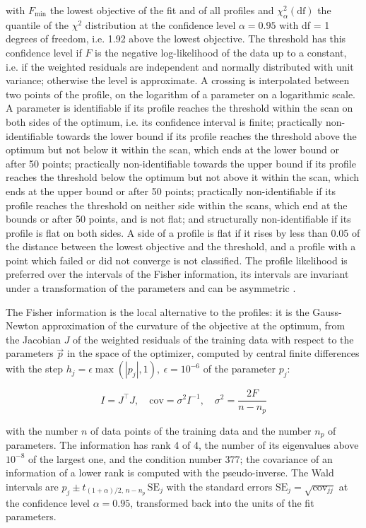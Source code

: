 \documentclass{article}
\begin{document}
with $F_{\min}$ the lowest objective of the fit and of all profiles and $\chi^2_{\alpha}(\mathrm{df})$ the quantile of the $\chi^2$ distribution at the confidence level $\alpha = 0.95$ with df = 1 degrees of freedom, i.e. 1.92 above the lowest objective. The threshold has this confidence level if $F$ is the negative log-likelihood of the data up to a constant, i.e. if the weighted residuals are independent and normally distributed with unit variance; otherwise the level is approximate. A crossing is interpolated between two points of the profile, on the logarithm of a parameter on a logarithmic scale. A parameter is identifiable if its profile reaches the threshold within the scan on both sides of the optimum, i.e. its confidence interval is finite; practically non-identifiable towards the lower bound if its profile reaches the threshold above the optimum but not below it within the scan, which ends at the lower bound or after 50 points; practically non-identifiable towards the upper bound if its profile reaches the threshold below the optimum but not above it within the scan, which ends at the upper bound or after 50 points; practically non-identifiable if its profile reaches the threshold on neither side within the scans, which end at the bounds or after 50 points, and is not flat; and structurally non-identifiable if its profile is flat on both sides. A side of a profile is flat if it rises by less than 0.05 of the distance between the lowest objective and the threshold, and a profile with a point which failed or did not converge is not classified. The profile likelihood is preferred over the intervals of the Fisher information, its intervals are invariant under a transformation of the parameters and can be asymmetric \cite{Wieland2021}.

The Fisher information is the local alternative to the profiles: it is the Gauss-Newton approximation of the curvature of the objective at the optimum, from the Jacobian $J$ of the weighted residuals of the training data with respect to the parameters $\vec{p}$ in the space of the optimizer, computed by central finite differences with the step $h_j = \epsilon \max(|p_j|, 1),\ \epsilon = 10^{-6}$ of the parameter $p_j$:

\begin{equation}
I = J^\top J, \quad \mathrm{cov} = \sigma^2 I^{-1}, \quad \sigma^2 = \frac{2 F}{n - n_p}
\end{equation}

with the number $n$ of data points of the training data and the number $n_p$ of parameters. The information has rank 4 of 4, the number of its eigenvalues above $10^{-8}$ of the largest one, and the condition number 377; the covariance of an information of a lower rank is computed with the pseudo-inverse. The Wald intervals are $\hat{p}_j \pm t_{(1+\alpha)/2,\, n-n_p}\, \mathrm{SE}_j$ with the standard errors $\mathrm{SE}_j = \sqrt{\mathrm{cov}_{jj}}$ at the confidence level $\alpha = 0.95$, transformed back into the units of the fit parameters.
\end{document}
